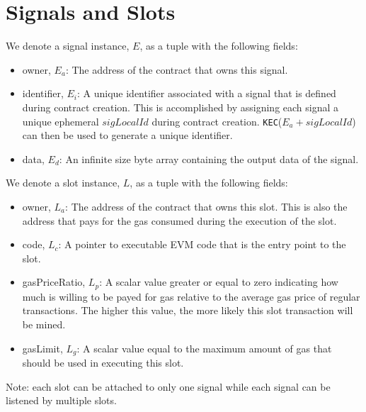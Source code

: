 \documentclass{article}
\begin{document}
\section{Signals and Slots}
We denote a signal instance, $E$, as a tuple with the following fields:
\begin{itemize}
    \item owner, $E_a$: The address of the contract that owns this signal.
    \item identifier, $E_{i}$: A unique identifier associated with a signal that is defined during contract creation. This is accomplished by assigning each signal a unique ephemeral $sigLocalId$ during contract creation. \texttt{KEC}($E_a + sigLocalId$) can then be used to generate a unique identifier.
    \item data, $E_d$: An infinite size byte array containing the output data of the signal.
\end{itemize}
We denote a slot instance, $L$, as a tuple with the following fields:
\begin{itemize}
    \item owner, $L_a$: The address of the contract that owns this slot. This is also the address that pays for the gas consumed during the execution of the slot.
    \item code, $L_c$: A pointer to executable EVM code that is the entry point to the slot.
    \item gasPriceRatio, $L_p$: A scalar value greater or equal to zero indicating how much is willing to be payed for gas relative to the average gas price of regular transactions. The higher this value, the more likely this slot transaction will be mined.
    \item gasLimit, $L_g$: A scalar value equal to the maximum amount of gas that should be used in executing this slot.
\end{itemize}
Note: each slot can be attached to only one signal while each signal can be listened by multiple slots.  
    
    
\end{document}
